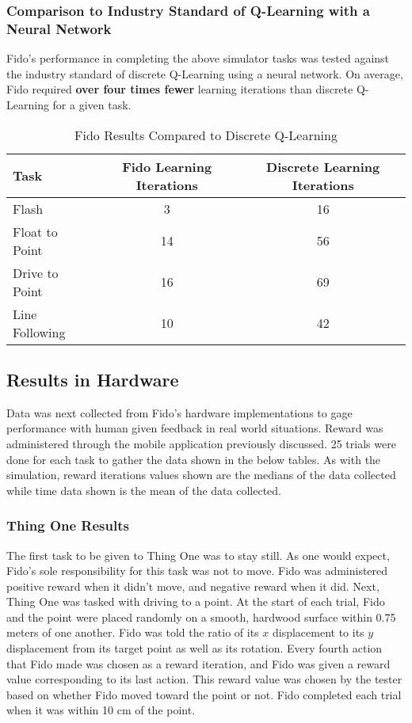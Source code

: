 \subsubsection{Comparison to Industry Standard of Q-Learning with a Neural Network}

Fido's performance in completing the above simulator tasks was tested against the industry standard of discrete Q-Learning using a neural network.  On average, Fido required \textbf{over four times fewer} learning iterations than discrete Q-Learning for a given task.

\begin{table}[ht]
	\centering
	\begin{tabular}{lcc}
		\toprule
		Task       		  & Fido Learning Iterations & Discrete Learning Iterations \\ \midrule
		Flash             & 3   & 16  \\
		Float to Point    & 14  & 56  \\
		Drive to Point    & 16  & 69  \\
		Line Following    & 10  & 42 \\ \bottomrule
	\end{tabular}
	\caption {Fido Results Compared to Discrete Q-Learning}
	\label{tab:simindustrystandardresults}
\end{table}

\subsection{Results in Hardware}

Data was next collected from Fido's hardware implementations to gage performance with human given feedback in real world situations.
Reward was administered through the mobile application previously discussed.  25 trials were done for each task to gather the data shown in the below tables.  As with the simulation, reward iterations values shown are the medians of the data collected while time data shown is the mean of the data collected.

\subsubsection{Thing One Results}

The first task to be given to Thing One was to stay still.
As one would expect, Fido's sole responsibility for this task was not to move.
Fido was administered positive reward when it didn't move, and negative reward when it did.
Next, Thing One was tasked with driving to a point.
At the start of each trial, Fido and the point were placed randomly on a smooth, hardwood surface within 0.75 meters of one another.
Fido was told the ratio of its $x$ displacement to its $y$ displacement from its target point as well as its rotation.
Every fourth action that Fido made was chosen as a reward iteration, and Fido was given a reward value corresponding to its last action.
This reward value was chosen by the tester based on whether Fido moved toward the point or not.
Fido completed each trial when it was within 10 cm of the point.


